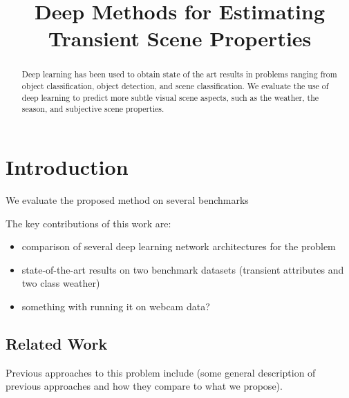\documentclass{article}
\title{Deep Methods for Estimating Transient Scene Properties}
\begin{document}
%
\maketitle
%
\begin{abstract}

  Deep learning has been used to obtain state of the art results in
  problems ranging from object classification, object detection, and
  scene classification. We evaluate the use of deep learning to
  predict more subtle visual scene aspects, such as the weather, the
  season, and subjective scene properties. 

\end{abstract}
%
\begin{keywords}
\end{keywords}

\section{Introduction}



We evaluate the proposed method on several benchmarks 


The key contributions of this work are:
\begin{itemize}

  \item comparison of several deep learning network architectures for
    the problem

  \item state-of-the-art results on two benchmark datasets (transient
    attributes and two class weather)

  \item something with running it on webcam data?

\end{itemize}

\subsection{Related Work}

Previous approaches to this problem include (some general description
of previous approaches and how they compare to what we propose).
\end{document}
